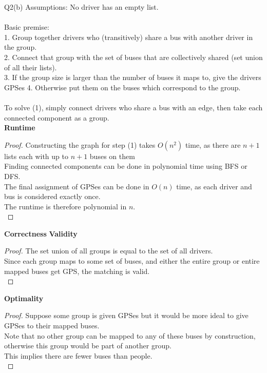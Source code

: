 \begin{problem}
    {Q2(b)}
    Assumptions: No driver has an empty list. \\\\
    Basic premise: \\
    1. Group together drivers who (transitively) share a bus with another driver in the group. \\
    2. Connect that group with the set of buses that are collectively shared (set union of all their lists). \\
    3. If the group size is larger than the number of buses it maps to, give the drivers GPSes
    4. Otherwise put them on the buses which correspond to the group. \\\\
    To solve (1), simply connect drivers who share a bus with an edge, then take each connected component as a group. \\
    \noindent
    \textbf{Runtime}
    \begin{proof}
        Constructing the graph for step (1) takes $O(n^2)$ time, as there are $n+1$ lists each with up to $n+1$ buses on them \\
        Finding connected components can be done in polynomial time using BFS or DFS. \\
        The final assignment of GPSes can be done in $O(n)$ time, as each driver and bus is considered exactly once. \\
        The runtime is therefore polynomial in $n$. \\
    \end{proof}
    \noindent
    \textbf{Correctness}
    \noindent
    \textbf{Validity}
    \begin{proof}
        The set union of all groups is equal to the set of all drivers. \\
        Since each group maps to some set of buses, and either the entire group or entire mapped buses get GPS, the matching is valid. \\
    \end{proof}
    \noindent
    \textbf{Optimality}
    \begin{proof}
        Suppose some group is given GPSes but it would be more ideal to give GPSes to their mapped buses. \\
        Note that no other group can be mapped to any of these buses by construction, otherwise this group would be part of another group. \\
        This implies there are fewer buses than people. \\

\end{proof}
\end{problem}
